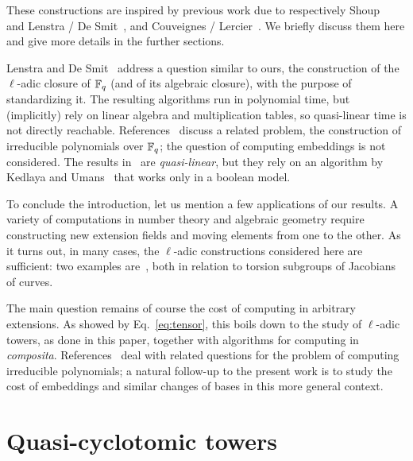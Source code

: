 \documentclass{sig-alternate}
\begin{document}
These constructions are inspired by previous work due to respectively
Shoup~\cite{Shoup90,shoup94} and Lenstra / De
Smit~\cite{lenstra+desmit08-stdmodels}, and Couveignes /
Lercier~\cite{couveignes+lercier11}. We briefly discuss them here and
give more details in the further sections.

Lenstra and De Smit~\cite{lenstra+desmit08-stdmodels} address a
question similar to ours, the construction of the $\ell$-adic closure
of $\mathbb{F}_q$ (and of its algebraic closure), with the purpose of
standardizing it. The resulting algorithms run in polynomial time, but
(implicitly) rely on linear algebra and multiplication tables, so
quasi-linear time is not directly reachable.
References~\cite{Shoup90,shoup94,couveignes+lercier11} discuss a
related problem, the construction of irreducible polynomials over
$\mathbb{F}_q$; the question of computing embeddings is not considered.  The
results in~\cite{couveignes+lercier11} are {\em quasi-linear}, but
they rely on an algorithm by Kedlaya and Umans~\cite{KeUm11} that
works only in a boolean model.

To conclude the introduction, let us mention a few applications of our
results. A variety of computations in number theory and algebraic
geometry require constructing new extension fields and moving elements
from one to the other. As it turns out, in many cases, the $\ell$-adic
constructions considered here are sufficient: two examples
are~\cite{df10,GaSc12}, both in relation to torsion subgroups of
Jacobians of curves.

The main question remains of course the cost of computing in arbitrary
extensions. As showed by Eq.~\eqref{eq:tensor}, this boils down to the
study of $\ell$-adic towers, as done in this paper, together with
algorithms for computing in \emph{composita}.
References~\cite{Shoup90,shoup94,couveignes+lercier11} deal with
related questions for the problem of computing irreducible polynomials;
a natural follow-up to the present work is to study the cost of
embeddings and similar changes of bases in this more general context.


\section{Quasi-cyclotomic towers}
\label{sec:LDtower}
\end{document}
